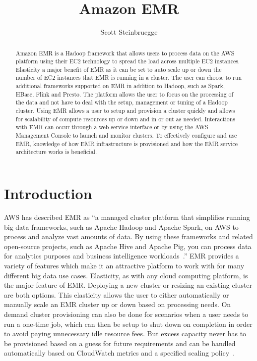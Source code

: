 \title{Amazon EMR}


\author{Scott Steinbruegge}


\renewcommand{\shortauthors}{S. Steinbruegge}


\begin{abstract}
Amazon EMR is a Hadoop framework that allows users to process data on the AWS platform using their EC2 technology to spread the load across multiple EC2 instances. Elasticity a major benefit of EMR as it can be set to auto scale up or down the number of EC2 instances that EMR is running in a cluster. The user can choose to run additional frameworks supported on EMR in addition to Hadoop, such as Spark, HBase, Flink and Presto. The platform allows the user to focus on the processing of the data and not have to deal with the setup, management or tuning of a Hadoop cluster. Using EMR allows a user to setup and provision a cluster quickly and allows for scalability of compute resources up or down and in or out as needed. Interactions with EMR can occur through a web service interface or by using the AWS Management Console to launch and monitor clusters. To effectively configure and use EMR, knowledge of how EMR infrastructure is provisioned and how the EMR service architecture works is beneficial.  
\end{abstract}


\maketitle

\section{Introduction}

AWS has described EMR as ``a managed cluster platform that simplifies running big data frameworks, such as Apache Hadoop and Apache Spark, on AWS to process and analyze vast amounts of data. By using these frameworks and related open-source projects, such as Apache Hive and Apache Pig, you can process data for analytics purposes and business intelligence workloads~\cite{hid-sp18-521-amazonemr-whatisemr}.'' EMR provides a variety of features which make it an attractive platform to work with for many different big data use cases. Elasticity, as with any cloud computing platform, is the major feature of EMR. Deploying a new cluster or resizing an existing cluster are both options. This elasticity allows the user to either automatically or manually scale an EMR cluster up or down based on processing needs. On demand cluster provisioning can also be done for scenarios when a user needs to run a one-time job, which can then be setup to shut down on completion in order to avoid paying unnecessary idle resource fees. But excess capacity never has to be provisioned based on a guess for future requirements and can be handled automatically based on CloudWatch metrics and a specified scaling policy~\cite{hid-sp18-521-amazonemr-details}.  

